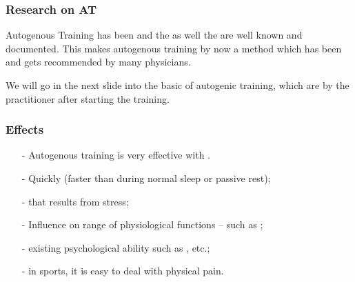 \begin{frame}
\frametitle{Research on AT}

Autogenous Training has been  and the  as well the  are well known and documented. This makes autogenous training by now a method which has been  and gets recommended by many physicians. 

We will go in the next slide into the basic  of autogenic training, which are  by the practitioner after starting the training.
\end{frame}

\begin{frame}
\frametitle{Effects}

\begin{itemize}
\item[-] Autogenous training is very effective with . 
\item[-] Quickly  (faster than during normal sleep or passive rest);
\item[-]  that results from stress;
\item[-] Influence on range of physiological functions – such as ;
\item[-]  existing psychological ability such as , etc.;
\item[-]  in sports, it is easy to deal with physical pain.
\end{itemize}

\end{frame}

